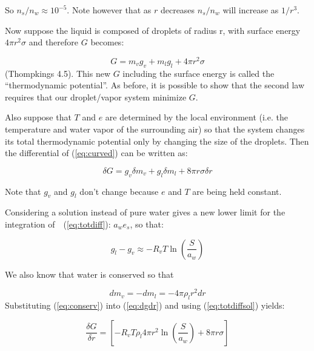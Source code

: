 \documentclass[12pt]{article}
\begin{document}
So $n_s/n_w \approx 10^{-5}$.  Note however that as $r$ decreases
$n_s/n_w$ will increase as $1/r^3$.

Now suppose the liquid is composed of droplets of radius r,
with surface energy $4 \pi r^2  \sigma $ and therefore $G$ becomes:

\begin{equation}
  \label{eq:curved}
  G= m_v g_v + m_l g_l + 4\pi r^2 \sigma
\end{equation}
(Thompkings 4.5).  This new $G$ including the surface energy is called the
``thermodynamic potential''.
As before, it is
possible to show that the second law requires that our droplet/vapor
system minimize $G$.


Also suppose that $T$ and
$e$ are determined by the local environment (i.e. the temperature and
water vapor of the surrounding air) so that the system changes its
total thermodynamic potential only by changing the size of the droplets.
Then the differential of  (\ref{eq:curved}) can be written as:

\begin{equation}
  \label{eq:dgdr}
  \delta G = g_v \delta m_v + g_l \delta m_l + 8 \pi r \sigma \delta r
\end{equation}

\noindent
Note that $g_v$ and $g_l$ don't change because $e$ and $T$ are being
held constant.

Considering a solution instead of pure water gives a new lower limit
for the integration of~~(\ref{eq:totdiff}):  $a_w e_s$, so that:

\begin{equation}
  \label{eq:totdiffsol}
  g_l - g_v \approx -R_v T \ln \left (\frac{S}{a_w} \right )
\end{equation}



  We also
know that water is conserved so that 

\begin{equation}
  \label{eq:conserv}
dm_v = - dm_l =    - 4 \pi \rho_l r^2 dr
\end{equation}
Substituting (\ref{eq:conserv}) into (\ref{eq:dgdr}) and using (\ref{eq:totdiffsol})
yields:


\begin{equation}
  \label{eq:dEdr}
  \frac{\delta G}{\delta r} = \left [ -R_v T \rho_l 4 \pi r^2 \ln \left ( \frac{S}{a_w}
    \right ) + 8 \pi r \sigma \right ]
\end{equation}
\end{document}
